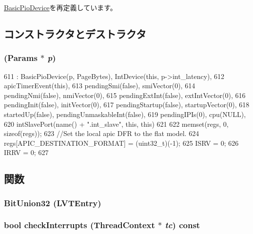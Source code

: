 \hyperlink{classBasicPioDevice_a2845515ac6467f10540747053c8a0449}{BasicPioDevice}を再定義しています。

\subsection{コンストラクタとデストラクタ}
\hypertarget{classX86ISA_1_1Interrupts_a3d148759405b99148e0c34750966edb1}{
\subsubsection[{Interrupts}]{ ({\bf Params} $\ast$ {\em p})}}
\label{classX86ISA_1_1Interrupts_a3d148759405b99148e0c34750966edb1}



\begin{DoxyCode}
611     : BasicPioDevice(p, PageBytes), IntDevice(this, p->int_latency),
612       apicTimerEvent(this),
613       pendingSmi(false), smiVector(0),
614       pendingNmi(false), nmiVector(0),
615       pendingExtInt(false), extIntVector(0),
616       pendingInit(false), initVector(0),
617       pendingStartup(false), startupVector(0),
618       startedUp(false), pendingUnmaskableInt(false),
619       pendingIPIs(0), cpu(NULL),
620       intSlavePort(name() + ".int_slave", this, this)
621 {
622     memset(regs, 0, sizeof(regs));
623     //Set the local apic DFR to the flat model.
624     regs[APIC_DESTINATION_FORMAT] = (uint32_t)(-1);
625     ISRV = 0;
626     IRRV = 0;
627 }
\end{DoxyCode}


\subsection{関数}
\hypertarget{classX86ISA_1_1Interrupts_af3c3b79e5ae32617b335938e6717ea0e}{
\subsubsection[{BitUnion32}]{\setlength{\rightskip}{0pt plus 5cm}BitUnion32 (LVTEntry)}}
\label{classX86ISA_1_1Interrupts_af3c3b79e5ae32617b335938e6717ea0e}
\hypertarget{classX86ISA_1_1Interrupts_af3c66fb49fec598cf78aaec29d764952}{
\subsubsection[{checkInterrupts}]{\setlength{\rightskip}{0pt plus 5cm}bool checkInterrupts ({\bf ThreadContext} $\ast$ {\em tc}) const}}
\label{classX86ISA_1_1Interrupts_af3c66fb49fec598cf78aaec29d764952}



